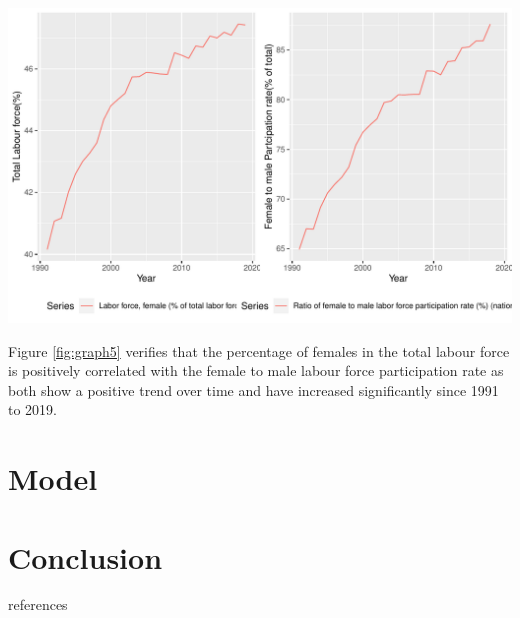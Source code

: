 \documentclass[11pt,a4paper,]{article}
\let\origfigure\figure
\let\endorigfigure\endfigure
\renewenvironment{figure}[1][2] {
    \expandafter\origfigure\expandafter[H]
} {
    \endorigfigure
}%
\begin{document}
\begin{figure}
\centering
\includegraphics{report_files/figure-latex/graph5-1.pdf}
\caption{\label{fig:graph5}Comparing female labour force with female-male
participation rate}
\end{figure}

Figure \ref{fig:graph5} verifies that the percentage of females in the
total labour force is positively correlated with the female to male
labour force participation rate as both show a positive trend over time
and have increased significantly since 1991 to 2019.

\section*{Model}

\section*{Conclusion}

references

\printbibliography
\end{document}
